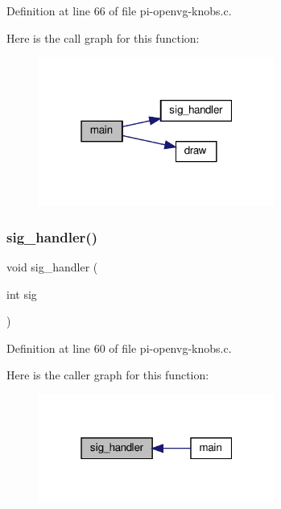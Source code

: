 Definition at line 66 of file pi-\/openvg-\/knobs.\+c.

Here is the call graph for this function\+:\nopagebreak
\begin{figure}[H]
\begin{center}
\leavevmode
\includegraphics[width=220pt]{pi-openvg-knobs_8c_a3c04138a5bfe5d72780bb7e82a18e627_cgraph}
\end{center}
\end{figure}
\mbox{\label{pi-openvg-knobs_8c_a5054c36923934387c6f7605dd1a2f3c9}} 
\subsubsection{\texorpdfstring{sig\+\_\+handler()}{sig\_handler()}}
{\footnotesize\ttfamily void sig\+\_\+handler (\begin{DoxyParamCaption}\item[{int}]{sig }\end{DoxyParamCaption})}



Definition at line 60 of file pi-\/openvg-\/knobs.\+c.

Here is the caller graph for this function\+:\nopagebreak
\begin{figure}[H]
\begin{center}
\leavevmode
\includegraphics[width=220pt]{pi-openvg-knobs_8c_a5054c36923934387c6f7605dd1a2f3c9_icgraph}
\end{center}
\end{figure}

